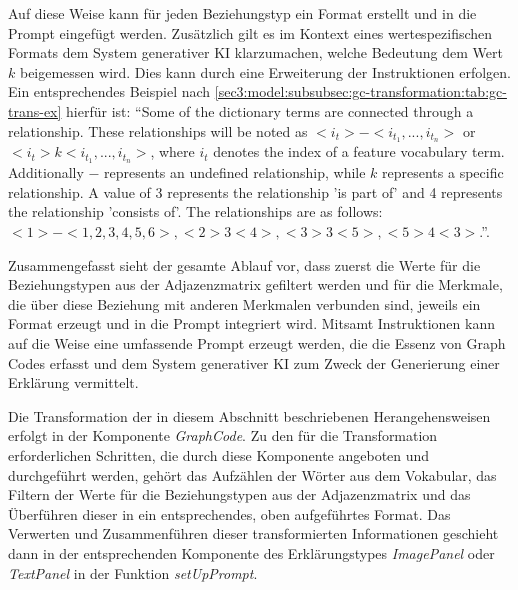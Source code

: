 Auf diese Weise kann für jeden Beziehungstyp ein Format erstellt und in die Prompt eingefügt werden.
Zusätzlich gilt es im Kontext eines wertespezifischen Formats dem System generativer KI klarzumachen, welche Bedeutung dem Wert $k$ beigemessen wird.
Dies kann durch eine Erweiterung der Instruktionen erfolgen.
Ein entsprechendes Beispiel nach \cref{sec3:model:subsubsec:gc-transformation:tab:gc-trans-ex} hierfür ist: \enquote{Some of the dictionary terms are connected through a relationship. These relationships will be noted as $<i_{t}> - <i_{t_{1}},...,i_{t_{n}}>$ or $<i_{t}> k <i_{t_{1}},...,i_{t_{n}}>$, where $i_{t}$ denotes the index of a feature vocabulary term. Additionally $-$ represents an undefined relationship, while $k$ represents a specific relationship. A value of 3 represents the relationship 'is part of' and 4 represents the relationship 'consists of'. The relationships are as follows: $<1> - <1,2,3,4,5,6>, <2> 3 <4>, <3> 3 <5>, <5> 4 <3>$.}.

Zusammengefasst sieht der gesamte Ablauf vor, dass zuerst die Werte für die Beziehungstypen aus der Adjazenzmatrix gefiltert werden und für die Merkmale, die über diese Beziehung mit anderen Merkmalen verbunden sind, jeweils ein Format erzeugt und in die Prompt integriert wird.
Mitsamt Instruktionen kann auf die Weise eine umfassende Prompt erzeugt werden, die die Essenz von Graph Codes erfasst und dem System generativer KI zum Zweck der Generierung einer Erklärung vermittelt.

Die Transformation der in diesem Abschnitt beschriebenen Herangehensweisen erfolgt in der Komponente \textit{GraphCode}.
Zu den für die Transformation erforderlichen Schritten, die durch diese Komponente angeboten und durchgeführt werden, gehört das Aufzählen der Wörter aus dem Vokabular, das Filtern der Werte für die Beziehungstypen aus der Adjazenzmatrix und das Überführen dieser in ein entsprechendes, oben aufgeführtes Format.
Das Verwerten und Zusammenführen dieser transformierten Informationen geschieht dann in der entsprechenden Komponente des Erklärungstypes \textit{ImagePanel} oder \textit{TextPanel} in der Funktion \textit{setUpPrompt}.


